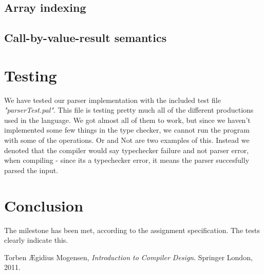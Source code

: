 \documentclass[10pt]{article}
\begin{document}
\subsection{Array indexing}
\subsection{Call-by-value-result semantics}

\section{Testing}
We have tested our parser implementation with the included test file \textit{"parserTest.pal"}. This file is testing pretty much all of the different productions used in the language. We got almost all of them to work, but since we haven't implemented some few things in the type checker, we cannot run the program with some of the operations. Or and Not are two examples of this. Instead we denoted that the compiler would say typechecker failure and not parser error, when compiling - since its a typechecker error, it means the parser succesfully parsed the input.

\section{Conclusion}
The milestone has been met, according to the assignment specification. The tests clearly indicate this.

\begin{thebibliography}{9}
Torben Ægidius Mogensen,
\emph{Introduction to Compiler Design}.
Springer London,
2011.
\end{thebibliography}


\end{document}
